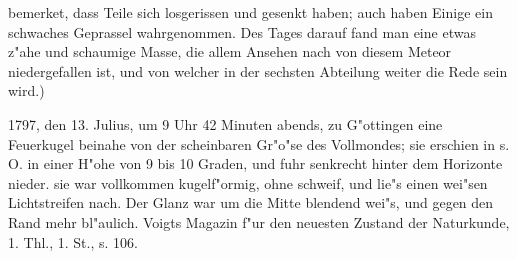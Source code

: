 \documentclass[a4paper, 11pt, oneside, polutonikogreek, german]{article}
\begin{document}
bemerket, dass Teile sich losgerissen und gesenkt haben; auch haben Einige ein schwaches Geprassel wahrgenommen. Des Tages darauf fand man eine etwas z"ahe und schaumige Masse, die allem Ansehen nach von diesem Meteor niedergefallen ist, und von welcher in der sechsten Abteilung weiter die Rede sein wird.)

1797, den 13. Julius, um 9 Uhr 42 Minuten abends, zu G"ottingen eine Feuerkugel beinahe von der scheinbaren Gr"o"se des Vollmondes; sie erschien in s. O. in einer H"ohe von 9 bis 10 Graden, und fuhr senkrecht hinter dem Horizonte nieder. sie war vollkommen kugelf"ormig, ohne schweif, und lie"s einen wei"sen Lichtstreifen nach. Der Glanz war um die Mitte blendend wei"s, und gegen den Rand mehr bl"aulich. Voigts Magazin f"ur den neuesten Zustand der Naturkunde, 1. Thl., 1. St., s. 106.
\end{document}
